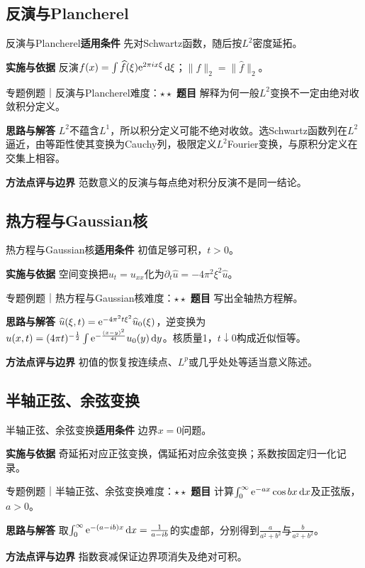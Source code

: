 \subsection{反演与Plancherel}\label{mat:fourier_transform:plancherel}
\begin{method}{反演与Plancherel}\textbf{适用条件} 先对Schwartz函数，随后按$L^2$密度延拓。\par\textbf{实施与依据} 反演$f(x)=\int\widehat f(\xi)\mathrm{e}^{2\pi ix\xi}\mathop{}\!\mathrm{d}\xi$；$\|f\|_2=\|\widehat f\|_2$。\end{method}
\begin{example}{专题例题｜反演与Plancherel}{难度：$\star\star$}
\textbf{题目} 解释为何一般$L^2$变换不一定由绝对收敛积分定义。\par\textbf{思路与解答} $L^2$不蕴含$L^1$，所以积分定义可能不绝对收敛。选Schwartz函数列在$L^2$逼近，由等距性使其变换为Cauchy列，极限定义$L^2$Fourier变换，与原积分定义在交集上相容。\par\textbf{方法点评与边界} 范数意义的反演与每点绝对积分反演不是同一结论。
\end{example}
\subsection{热方程与Gaussian核}\label{mat:fourier_transform:heat}
\begin{method}{热方程与Gaussian核}\textbf{适用条件} 初值足够可积，$t>0$。\par\textbf{实施与依据} 空间变换把$u_t=u_{xx}$化为$\partial_t\widehat u=-4\pi^2\xi^2\widehat u$。\end{method}
\begin{example}{专题例题｜热方程与Gaussian核}{难度：$\star\star$}
\textbf{题目} 写出全轴热方程解。\par\textbf{思路与解答} $\widehat u(\xi,t)=\mathrm{e}^{-4\pi^2t\xi^2}\widehat u_0(\xi)$，逆变换为$u(x,t)=(4\pi t)^{-\frac{1}{2}}\int\mathrm{e}^{-\frac{(x-y)^2}{4t}}u_0(y)\mathop{}\!\mathrm{d} y$。核质量1，$t\downarrow0$构成近似恒等。\par\textbf{方法点评与边界} 初值的恢复按连续点、$L^p$或几乎处处等适当意义陈述。
\end{example}
\subsection{半轴正弦、余弦变换}\label{mat:fourier_transform:sinecosine}
\begin{method}{半轴正弦、余弦变换}\textbf{适用条件} 边界$x=0$问题。\par\textbf{实施与依据} 奇延拓对应正弦变换，偶延拓对应余弦变换；系数按固定归一化记录。\end{method}
\begin{example}{专题例题｜半轴正弦、余弦变换}{难度：$\star\star$}
\textbf{题目} 计算$\int_0^\infty\mathrm{e}^{-ax}\cos bx\mathop{}\!\mathrm{d} x$及正弦版，$a>0$。\par\textbf{思路与解答} 取$\int_0^\infty\mathrm{e}^{-(a-ib)x}\mathop{}\!\mathrm{d} x=\frac{1}{a-ib}$的实虚部，分别得到$\frac{a}{a^2+b^2}$与$\frac{b}{a^2+b^2}$。\par\textbf{方法点评与边界} 指数衰减保证边界项消失及绝对可积。
\end{example}
